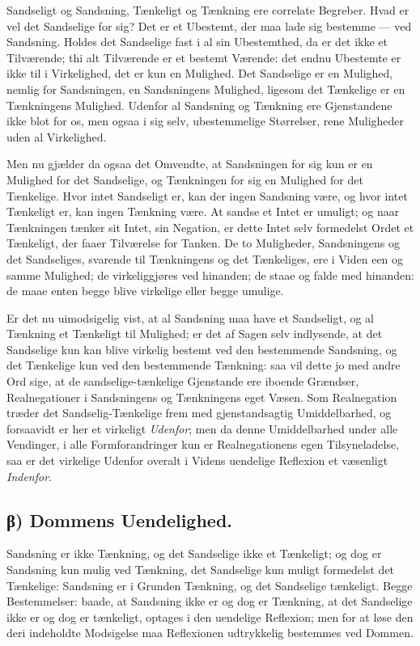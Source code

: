 \documentclass[12pt]{book}
\newcommand{\opage}[1]{\marginnote{\footnotesize\textit{[#1]}}}
\begin{document}
Sandseligt og Sandsning, Tænkeligt og Tænkning ere correlate
Begreber. Hvad er vel det Sandselige for sig? Det er et Ubestemt, der
maa lade sig bestemme --- ved Sandsning. Holdes det Sandselige fast i
al sin Ubestemthed, da er det ikke et Tilværende; thi alt Tilværende
er et bestemt Værende: det endnu Ubestemte er ikke til i Virkelighed,
det er kun en Mulighed. Det Sandselige er en Mulighed, nemlig for
Sandsningen, en Sandsningens Mulighed, ligesom det Tænkelige er en
Tænkningens Mulighed. Udenfor al Sandsning og Tænkning ere
Gjenstandene ikke blot for os, men ogsaa i sig selv, ubestemmelige
Størrelser, rene Muligheder uden al Virkelighed.

Men nu gjælder da ogsaa det Omvendte, at Sandsningen for sig kun er
en Mulighed for det Sandselige, og Tænkningen for sig en Mulighed for
det Tænkelige. Hvor intet Sandseligt er, kan der ingen Sandsning
være, og hvor intet Tænkeligt er, kan ingen Tænkning være. At sandse
et Intet er umuligt; og naar Tænkningen tænker sit Intet, sin
\opage{16} Negation, er dette Intet selv formedelst Ordet et Tænkeligt, der
faaer Tilværelse for Tanken. De to Muligheder, Sandsningens og det
Sandseliges, svarende til Tænkningens og det Tænkeliges, ere i Viden
een og samme Mulighed; de virkeliggjøres ved hinanden; de staae og
falde med hinanden: de maae enten begge blive virkelige eller begge
umulige.

Er det nu uimodsigelig vist, at al Sandsning maa have et Sandseligt,
og al Tænkning et Tænkeligt til Mulighed; er det af Sagen selv
indlysende, at det Sandselige kun kan blive virkelig bestemt ved den
bestemmende Sandsning, og det Tænkelige kun ved den bestemmende
Tænkning: saa vil dette jo med andre Ord sige, at de
sandselige-tænkelige Gjenstande ere iboende Grændser, Realnegationer
i Sandsningens og Tænkningens eget Væsen. Som Realnegation træder det
Sandselig-Tænkelige frem med gjenstandsagtig Umiddelbarhed, og
forsaavidt er her et virkeligt \emph{Udenfor}; men da denne
Umiddelbarhed under alle Vendinger, i alle Formforandringer kun er
Realnegationens egen Tilsyneladelse, saa er det virkelige Udenfor
overalt i Videns uendelige Reflexion et væsenligt \emph{Indenfor}.

\subsection*{β) Dommens Uendelighed.}

Sandsning er ikke Tænkning, og det Sandselige ikke et Tænkeligt; og
dog er Sandsning kun mulig ved Tænkning, det Sandselige kun muligt
formedelst det Tænkelige: Sandsning er i Grunden Tænkning, og det
Sandselige tænkeligt. Begge Bestemmelser: baade, at Sandsning ikke er
og dog er Tænkning, at det Sandselige ikke er og dog er tænkeligt,
optages i den uendelige Reflexion; men for at løse den deri
indeholdte Modsigelse maa Reflexionen udtrykkelig bestemmes ved
Dommen.
\end{document}
